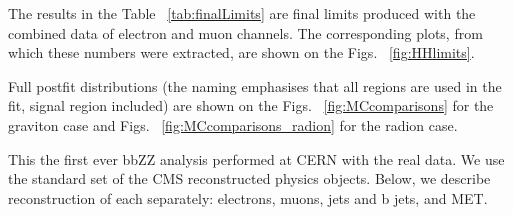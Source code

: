 The results in the Table ~\ref{tab:finalLimits} are final limits produced with the combined data of electron and muon channels. The corresponding plots, from which these numbers were extracted, are shown on the Figs. ~\ref{fig:HHlimits}. %

Full postfit distributions (the naming emphasises that all regions are used in the fit, signal region included) are shown on the Figs. ~\ref{fig:MCcomparisons} for the graviton case and Figs. ~\ref{fig:MCcomparisons_radion} for the radion case. 





This the first ever bbZZ analysis performed at CERN with the real data. We use the standard set of the CMS
reconstructed physics objects. Below, we describe reconstruction of
each separately: electrons, muons, jets and b jets, and MET.



